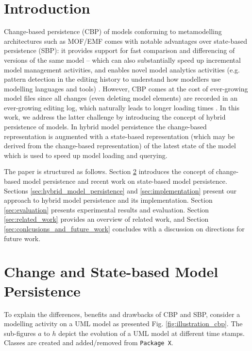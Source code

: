 \documentclass{llncs}
\begin{document}
\section{Introduction}
\label{sec:introduction}

Change-based persistence (CBP) of models \cite{DBLP:conf/models/YohannisKP17} conforming to metamodelling architectures such as MOF/EMF \cite{omg2018mof,steinberg2008emf} comes with notable advantages over state-based persistence (SBP): it provides support for fast comparison and differencing of versions of the same model \cite{DBLP:conf/sde/LippeO92,DBLP:conf/caise/IgnatN05,DBLP:conf/edoc/KoegelHLHD10,koegel2010emfstore} -- which can also substantially speed up incremental model management activities, and enables novel model analytics activities (e.g. pattern detection in the editing history to understand how modellers use modelling languages and tools) \cite{DBLP:journals/entcs/RobbesL07}. However, CBP comes at the cost of ever-growing model files \cite{DBLP:conf/edoc/KoegelHLHD10,DBLP:journals/entcs/RobbesL07} since all changes (even deleting model elements) are recorded in an ever-growing editing log, which naturally leads to longer loading times \cite{mens2002state}. In this work, we address the latter challenge by introducing the concept of hybrid persistence of models. In hybrid model persistence the change-based representation is augmented with a state-based representation (which may be derived from the change-based representation) of the latest state of the model which is used to speed up model loading and querying.

The paper is structured as follows. Section \ref{sec:change_and_state_based_model_persistence} introduces the concept of change-based model persistence and recent work on state-based model persistence. Sections \ref{sec:hybrid_model_persistence} and \ref{sec:implementation} present our approach to hybrid model persistence and its implementation. Section \ref{sec:evaluation} presents experimental results and evaluation. Section \ref{sec:related_work} provides an overview of related work, and Section \ref{sec:conlcusions_and_future_work} concludes with a discussion on directions for future work.

\section{Change and State-based Model Persistence}
\label{sec:change_and_state_based_model_persistence}
To explain the differences, benefits and drawbacks of CBP and SBP, consider a modelling activity on a UML model as presented Fig. \ref{fig:illustration_cbp}. The sub-figures $a$ to $h$ depict the evolution of a UML model at different time stamps. Classes are created and added/removed from \texttt{Package X}. 
\end{document}
